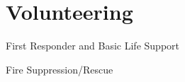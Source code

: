 \documentclass[letterpaper]{hunter}
\begin{document}
\begin{minipage}[t]{0.66\textwidth}
		\section{Volunteering}
		\begin{entryList}{1}
			\item First Responder and Basic Life Support
			\item Fire Suppression/Rescue
		\end{entryList}	
	\end{minipage}
\end{document}
